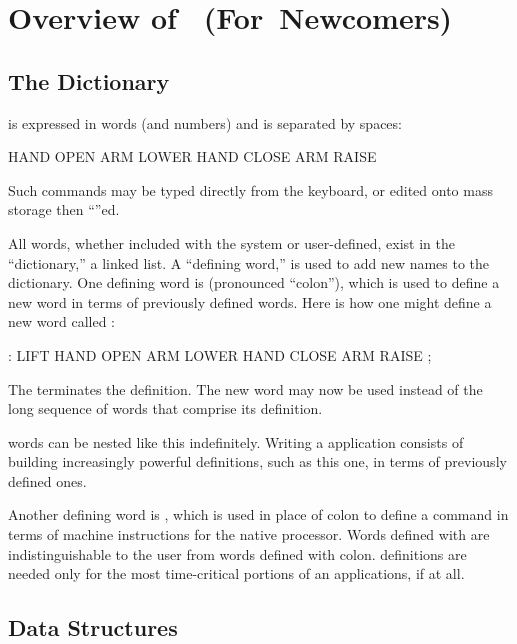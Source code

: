 \appendix{}
\chapter{Overview of~\Forth{} (For~Newcomers)}

\section{The Dictionary}%
%
%

\expandafter\initialb\Forth{} is expressed in words (and numbers) and is separated by spaces:
\begin{Code}
HAND OPEN  ARM LOWER  HAND CLOSE  ARM RAISE 
\end{Code}
Such commands may be typed directly from the keyboard, or edited onto 
mass storage then ``''ed.

All words, whether included with the system or user-defined, exist in the
``dictionary,'' a linked list.  A ``defining word,'' is used to add new
names to the dictionary.  One defining word is \forthb{:} (pronounced
``colon''), which is used to define a new word in terms of previously
defined words.  Here is how one might define a new word called :
\begin{Code}
: LIFT   HAND OPEN  ARM LOWER  HAND CLOSE  ARM RAISE ;
\end{Code}
The \forthb{;} terminates the definition.  The new word  may
now be used instead of the long sequence of words that comprise its
definition.

\Forth{} words can be nested like this indefinitely.  Writing a 
\Forth{} application consists of building increasingly powerful definitions,
such as this one, in terms of previously defined ones.

Another defining word is ,
which is used in place of colon to define a command in terms of machine
instructions for the native processor.  Words defined with 
are indistinguishable to the user from words defined with colon.
 definitions are needed only for the most time-critical
portions of an applications, if at all.

\section{Data Structures}%
%

